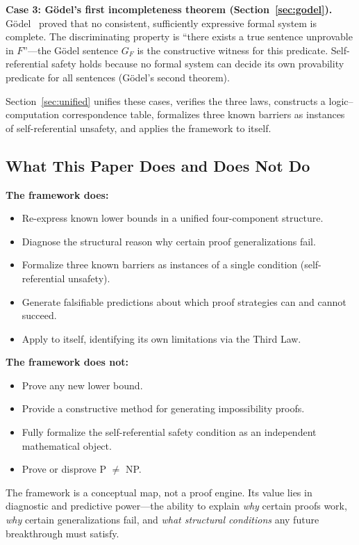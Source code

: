 \documentclass[11pt,a4paper]{article}
\theoremstyle{plain}
\theoremstyle{definition}
\theoremstyle{remark}
\begin{document}
\textbf{Case 3: G\"{o}del's first incompleteness theorem (Section~\ref{sec:godel}).} G\"{o}del~\cite{Godel1931} proved that no consistent, sufficiently expressive formal system is complete. The discriminating property is ``there exists a true sentence unprovable in $F$''---the G\"{o}del sentence $G_F$ is the constructive witness for this predicate. Self-referential safety holds because no formal system can decide its own provability predicate for all sentences (G\"{o}del's second theorem).

Section~\ref{sec:unified} unifies these cases, verifies the three laws, constructs a logic--computation correspondence table, formalizes three known barriers as instances of self-referential unsafety, and applies the framework to itself.

\subsection{What This Paper Does and Does Not Do}

\textbf{The framework does:}
\begin{itemize}
\item Re-express known lower bounds in a unified four-component structure.
\item Diagnose the structural reason why certain proof generalizations fail.
\item Formalize three known barriers as instances of a single condition (self-referential unsafety).
\item Generate falsifiable predictions about which proof strategies can and cannot succeed.
\item Apply to itself, identifying its own limitations via the Third Law.
\end{itemize}

\textbf{The framework does not:}
\begin{itemize}
\item Prove any new lower bound.
\item Provide a constructive method for generating impossibility proofs.
\item Fully formalize the self-referential safety condition as an independent mathematical object.
\item Prove or disprove P $\neq$ NP.
\end{itemize}

The framework is a conceptual map, not a proof engine. Its value lies in diagnostic and predictive power---the ability to explain \emph{why} certain proofs work, \emph{why} certain generalizations fail, and \emph{what structural conditions} any future breakthrough must satisfy.
\end{document}
